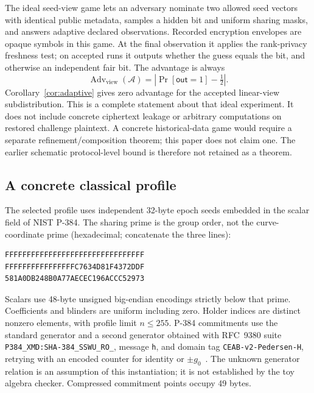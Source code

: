 \documentclass[pdflatex,sn-mathphys-num]{sn-jnl}
\theoremstyle{plain}
\theoremstyle{definition}
\newcommand{\Adv}{\operatorname{Adv}}
\newcommand{\code}[1]{\texttt{#1}}
\begin{document}
The ideal seed-view game lets an adversary nominate two allowed seed vectors with identical public metadata, samples a hidden bit and uniform sharing masks, and answers adaptive declared observations. Recorded encryption envelopes are opaque symbols in this game. At the final observation it applies the rank-privacy freshness test; on accepted runs it outputs whether the guess equals the bit, and otherwise an independent fair bit. The advantage is always
\begin{equation}\label{eq:advantage}
 \Adv_{\mathrm{view}}(\mathcal A)=\left|\Pr[\mathsf{out}=1]-\tfrac12\right|.
\end{equation}
Corollary~\ref{cor:adaptive} gives zero advantage for the accepted linear-view subdistribution. This is a complete statement about that ideal experiment. It does not include concrete ciphertext leakage or arbitrary computations on restored challenge plaintext. A concrete historical-data game would require a separate refinement/composition theorem; this paper does not claim one. The earlier schematic protocol-level bound is therefore not retained as a theorem.

\subsection{A concrete classical profile}\label{sec:profile}
The selected profile uses independent 32-byte epoch seeds embedded in the scalar field of NIST P-384. The sharing prime is the group order, not the curve-coordinate prime (hexadecimal; concatenate the three lines):
\begin{Verbatim}[fontsize=\small]
FFFFFFFFFFFFFFFFFFFFFFFFFFFFFFFF
FFFFFFFFFFFFFFFFC7634D81F4372DDF
581A0DB248B0A77AECEC196ACCC52973
\end{Verbatim}
Scalars use 48-byte unsigned big-endian encodings strictly below that prime. Coefficients and blinders are uniform including zero. Holder indices are distinct nonzero elements, with profile limit $n\le255$. P-384 commitments use the standard generator and a second generator obtained with RFC~9380 suite \code{P384\_XMD:SHA-384\_SSWU\_RO\_}, message \code{h}, and domain tag \code{CEAB-v2-Pedersen-H}, retrying with an encoded counter for identity or $\pm g_0$~\cite{rfc9380,sec2}. The unknown generator relation is an assumption of this instantiation; it is not established by the toy algebra checker. Compressed commitment points occupy 49 bytes.
\end{document}
